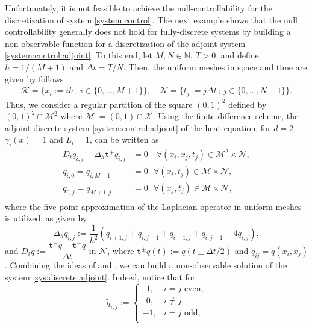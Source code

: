 \documentclass[11pt,oneside,leqno]{amsart}
\numberwithin{equation}{section}
\numberwithin{equation}{section}
\newcommand{\trp}{\mathtt t^+}
\newcommand{\trm}{\mathtt t^-}
\newcommand{\trpm}{\mathtt t^\pm}
\begin{document}
\par Unfortunately, it is not feasible to achieve the null-controllability for the discretization of system \eqref{system:control}. The next example shows that the null controllability generally does not hold for fully-discrete systems by building a non-observable function for a discretization of the adjoint system \eqref{system:control:adjoint}. To this end, let $M,N\in \mathbb{N}$, $T>0$, and define $h=1/(M+1)$ and $\Delta t=T/N$. Then, the uniform meshes in space and time are given by follows
\begin{align*}
    \mathcal{K}=\{x_i:=ih\,;\, i\in \{ 0,\ldots,M+1 \}\},\quad
    \mathcal{N}=\{t_j:=j\Delta t\, ;\, j\in \{ 0,\ldots,N-1 \}\}. 
\end{align*}
Thus, we consider a regular partition of the square $(0,1)^{2}$ defined by $(0,1)^{2}\cap\mathcal{M}^{2}$ where $\mathcal{M}:=(0,1)\cap\mathcal{K}$. Using the finite-difference scheme, the adjoint discrete system \eqref{system:control:adjoint} of the heat equation, for $d=2$, $\gamma_{i}(x)=1$ and $L_{i}=1
$, can be written as
\begin{equation}\label{sys:discrete:adjoint}
\begin{split}
    D_{t}q_{i,j}+\Delta_{h}\trp q_{i,j}&=0 \quad \forall(x_{i},x_{j},t_{j})\in\mathcal{M}^{2}\times\mathcal{N},\\
    q_{i,0}=q_{i,M+1}&=0\  \ \ \forall (x_{i},t_{j})\in\mathcal{M}\times \mathcal{N},\\
    q_{0,j}=q_{M+1,j}&=0 \ \ \ \forall (x_{j},t_{j})\in \mathcal{M}\times\mathcal{N},\\
    \end{split}
\end{equation}
where the five-point approximation of the Laplacian operator in uniform meshes is utilized, as given by
\begin{equation}
    \Delta_{h}q_{i,j}:=\frac{1}{h^{2}}\left(q_{i+1,j}+q_{i,j+1}+q_{i-1,j}+q_{i,j-1}-4q_{i,j}\right),
\end{equation}
and $D_{t} q:=\dfrac{\trm q-\trm q}{\Delta t}$ in $\mathcal{N}$, where $\trpm q(t):=q(t\pm \Delta t/2)$ and $q_{ij}=q(x_{i},x_{j})$. Combining the ideas of \cite{zuazua:2005} and \cite{ervedoza:2019}, we can build a non-observable solution of the system \eqref{sys:discrete:adjoint}. 
Indeed, notice that for
\begin{equation}
    \tilde{q}_{i,j}:=\begin{cases}
    \ \ 1,& i=j \text{ even,}\\
    \ \ 0,& i\ne j,\\
    -1,& i=j\text{ odd},\\
    \end{cases}
\end{equation}
\end{document}
